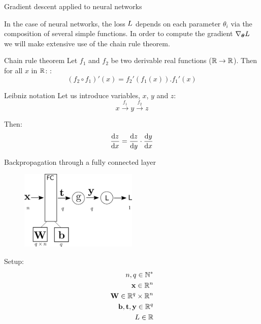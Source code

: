\documentclass[xcolor=pdftex,dvipsnames,table,mathserif]{beamer}
\begin{document}
\begin{frame}{Gradient descent applied to neural networks}

  In the case of neural networks, the loss $L$ depends on each parameter $\theta_i$ via the composition of several simple functions. In order to compute the gradient $\nabla_{\boldsymbol{\theta}}L$ we will make extensive use of the chain rule theorem.

  \begin{block}{Chain rule theorem}
    Let $f_1$ and $f_2$ be two derivable real functions ($\mathbb{R} \rightarrow \mathbb{R}$). Then for all $x$ in $\mathbb{R}$:   :
    \[
     (f_2 \circ f_1)'(x) = f_2'(f_1(x)).f_1'(x)
    \]
  \end{block}


\begin{block}{Leibniz notation}
  Let us introduce variables, $x$, $y$ and $z$:
  \[x \xrightarrow{f_1} y \xrightarrow{f_2} z\]

  Then:
  \[\dv{z}{x} = \dv{z}{y} \cdot \dv{y}{x} \]

\end{block}

\end{frame}















\begin{frame}{Backpropagation through a fully connected layer}
\begin{figure}
\includegraphics[width=0.5\textwidth]{../graphics/bp_fc.png}
\end{figure}

Setup:
\begin{eqnarray*}
n, q \in \mathbb{N}^*\\
\mathbf{x} \in \mathbb{R}^n \\
\mathbf{W} \in \mathbb{R}^q \times \mathbb{R}^n \\
\mathbf{b}, \mathbf{t}, \mathbf{y} \in \mathbb{R}^q \\
L \in \mathbb{R}
\end{eqnarray*}

\end{frame}
\end{document}

